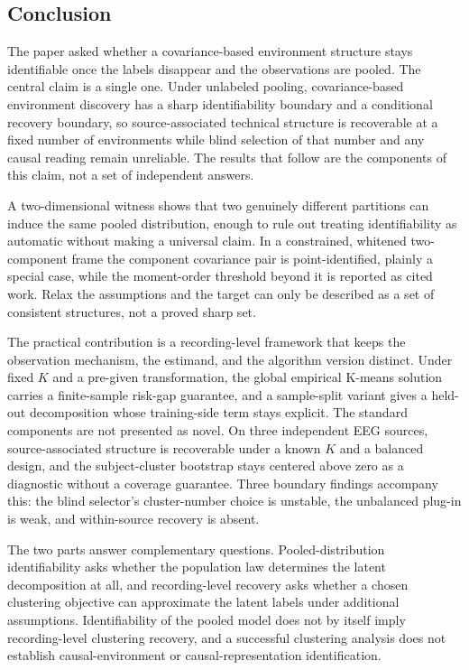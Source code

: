 \subsection{Conclusion}\label{conclusion}

The paper asked whether a covariance-based environment structure stays
identifiable once the labels disappear and the observations are pooled.
The central claim is a single one. Under unlabeled pooling,
covariance-based environment discovery has a sharp identifiability
boundary and a conditional recovery boundary, so source-associated
technical structure is recoverable at a fixed number of environments
while blind selection of that number and any causal reading remain
unreliable. The results that follow are the components of this claim,
not a set of independent answers.

A two-dimensional witness shows that two genuinely different partitions
can induce the same pooled distribution, enough to rule out treating
identifiability as automatic without making a universal claim. In a
constrained, whitened two-component frame the component covariance pair
is point-identified, plainly a special case, while the moment-order
threshold beyond it is reported as cited work. Relax the assumptions and
the target can only be described as a set of consistent structures, not
a proved sharp set.

The practical contribution is a recording-level framework that keeps the
observation mechanism, the estimand, and the algorithm version distinct.
Under fixed \(K\) and a pre-given transformation, the global empirical
K-means solution carries a finite-sample risk-gap guarantee, and a
sample-split variant gives a held-out decomposition whose training-side
term stays explicit. The standard components are not presented as novel.
On three independent EEG sources, source-associated structure is
recoverable under a known \(K\) and a balanced design, and the
subject-cluster bootstrap stays centered above zero as a diagnostic
without a coverage guarantee. Three boundary findings accompany this:
the blind selector's cluster-number choice is unstable, the unbalanced
plug-in is weak, and within-source recovery is absent.

The two parts answer complementary questions. Pooled-distribution
identifiability asks whether the population law determines the latent
decomposition at all, and recording-level recovery asks whether a chosen
clustering objective can approximate the latent labels under additional
assumptions. Identifiability of the pooled model does not by itself
imply recording-level clustering recovery, and a successful clustering
analysis does not establish causal-environment or causal-representation
identification.

